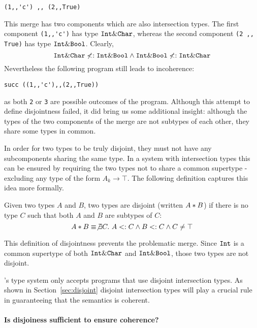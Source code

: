 \begin{lstlisting}
(1,,'c') ,, (2,,True)
\end{lstlisting}

\noindent This merge has two components which are also intersection
types. The first component \lstinline{(1,,'c')} has type $\texttt{Int} \&
\texttt{Char}$, whereas the second component \lstinline{(2 ,, True)} has type
$\texttt{Int} \& \texttt{Bool}$. Clearly,
\[ \texttt{Int} \& \texttt{Char} \not <: \texttt{Int} \& \texttt{Bool} \wedge \texttt{Int} \& \texttt{Bool} \not <: \texttt{Int} \& \texttt{Char} \]
Nevertheless the following program still leads to
incoherence:
\begin{lstlisting}
succ ((1,,'c'),,(2,,True))
\end{lstlisting}
as both \lstinline{2} or \lstinline{3} are possible outcomes
of the program. Although this attempt to define disjointness failed,
it did bring us some additional insight: although the types of the two
components of the merge are not subtypes of each other, they share
some types in common.

In order for two types to be truly disjoint, they must not have any
subcomponents sharing the same type. In a system with intersection
types this can be ensured by requiring the two types not to share a
common supertype - excluding any type of the form ${A_k} \to \top$.
The following definition captures this idea more formally.

\begin{definition}[Disjointness]
  Given two types $A$ and $B$, two types are disjoint
  (written $A * B$) if there is no type $C$ such that both $A$ and $B$ are
  subtypes of $C$:
  \[A * B \equiv \not\exists C.~A <: C \wedge B <: C \wedge C \neq \top\]
\end{definition}

\noindent This definition of disjointness prevents the problematic
merge. Since $\texttt{Int}$ is a common supertype of both $\texttt{Int} \& \texttt{Char}$ and
$\texttt{Int} \& \texttt{Bool}$, those two types are not disjoint.

\name's type system only accepts programs that use disjoint intersection
types. As shown in Section~\ref{sec:disjoint} disjoint intersection types will
play a crucial rule in guaranteeing that the semantics is coherent.


\paragraph {Is disjoiness sufficient to ensure coherence?}

